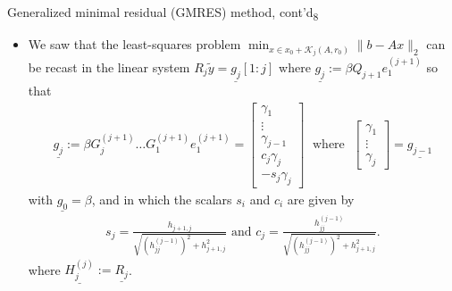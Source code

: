 \documentclass[t,usepdftitle=false]{beamer}
\begin{document}
\begin{frame}{Generalized minimal residual (GMRES) method, cont'd\textsubscript{8}}
\begin{itemize}
\item We saw that the least-squares problem $\min_{x\in x_0+\mathcal{K}_j(A,r_0)}\|b-Ax\|_2$ can be recast in the linear system $R_j\tilde{y}=\underline{g_j}[1:j]$ where $\underline{g_j}:=\beta Q_{j+1}e_1^{(j+1)}$ so that
\begin{align*}
\underline{g_j}:=\beta G_j^{(j+1)}\dots G_1^{(j+1)}e_1^{(j+1)}=
\begin{bmatrix}
\gamma_1\\\vdots\\\gamma_{j-1}\\c_j\gamma_{j}\\-s_j\gamma_{j}
\end{bmatrix}
\;\text{ where }\;
\begin{bmatrix}
\gamma_1\\\vdots\\\gamma_{j}
\end{bmatrix}
=\underline{g_{j-1}}
\end{align*}
with $\underline{g_0}=\beta$, and in which the scalars $s_i$ and $c_i$ are given by
\begin{align*}
s_j=\frac{h_{j+1,j}}{\sqrt{\left(h_{jj}^{(j-1)}\right)^{2}+h_{j+1,j}^2}}
\text{ and }
c_j=\frac{h_{jj}^{(j-1)}}{\sqrt{\left(h_{jj}^{(j-1)}\right)^{2}+h_{j+1,j}^2}}.
\end{align*}
where $\underline{H_{j}^{(j)}}:=\underline{R_j}$.
\end{itemize}
\end{frame}
\end{document}
